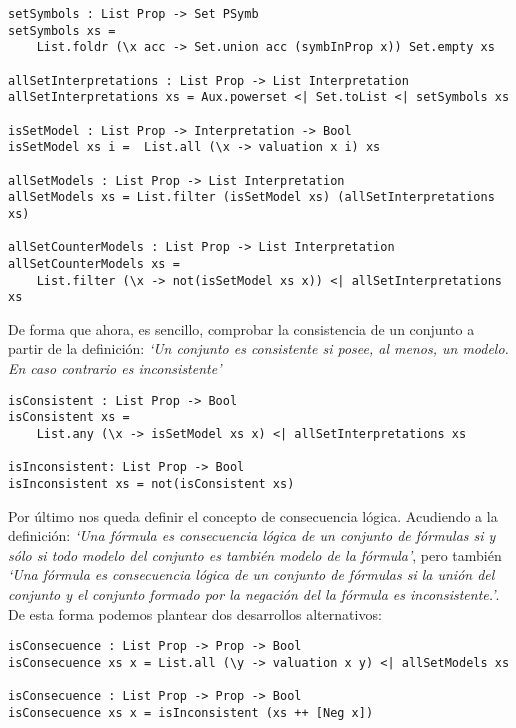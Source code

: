 \documentclass[a4paper]{report}
\begin{document}
\begin{lstlisting}[caption={Modelos y contramodelos en conjuntos de fórmulas proposicionales}]
setSymbols : List Prop -> Set PSymb
setSymbols xs = 
    List.foldr (\x acc -> Set.union acc (symbInProp x)) Set.empty xs

allSetInterpretations : List Prop -> List Interpretation
allSetInterpretations xs = Aux.powerset <| Set.toList <| setSymbols xs
    
isSetModel : List Prop -> Interpretation -> Bool
isSetModel xs i =  List.all (\x -> valuation x i) xs

allSetModels : List Prop -> List Interpretation
allSetModels xs = List.filter (isSetModel xs) (allSetInterpretations xs)

allSetCounterModels : List Prop -> List Interpretation
allSetCounterModels xs = 
    List.filter (\x -> not(isSetModel xs x)) <| allSetInterpretations xs
\end{lstlisting}


De forma que ahora, es sencillo, comprobar la consistencia de un conjunto a partir de la definición: \textit{`Un conjunto es consistente si posee, al menos, un modelo. En caso contrario es inconsistente'}\\

\begin{lstlisting}[caption={Consistencia e Inconsistencia en Conjuntos Proposicionales}]
isConsistent : List Prop -> Bool
isConsistent xs = 
    List.any (\x -> isSetModel xs x) <| allSetInterpretations xs
    
isInconsistent: List Prop -> Bool
isInconsistent xs = not(isConsistent xs)
\end{lstlisting}

Por último nos queda definir el concepto de consecuencia lógica. Acudiendo a la definición: \textit{`Una fórmula es consecuencia lógica de un conjunto de fórmulas si y sólo si todo modelo del conjunto es también modelo de la fórmula'}, pero también \textit{`Una fórmula es consecuencia lógica de un conjunto de fórmulas si la unión del conjunto y el conjunto formado por la negación del la fórmula es inconsistente.'}. De esta forma podemos plantear dos desarrollos alternativos:\\

\begin{lstlisting}[caption={Consecuencia Lógica}]
isConsecuence : List Prop -> Prop -> Bool
isConsecuence xs x = List.all (\y -> valuation x y) <| allSetModels xs

isConsecuence : List Prop -> Prop -> Bool
isConsecuence xs x = isInconsistent (xs ++ [Neg x])
\end{lstlisting}
\end{document}
